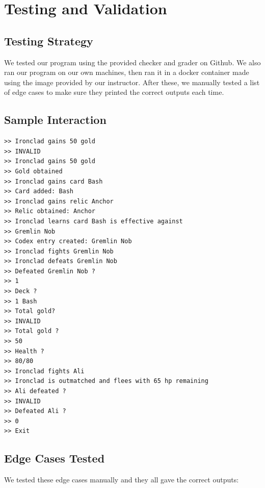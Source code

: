 \documentclass[12pt,a4paper]{article}
\begin{document}
\section{Testing and Validation}

\subsection{Testing Strategy}

We tested our program using the provided checker and grader on Github. We also ran our program on our own machines, then ran it in a docker container made using the image provided by our instructor. After these, we manually tested a list of edge cases to make sure they printed the correct outputs each time.

\subsection{Sample Interaction}

\begin{lstlisting}
>> Ironclad gains 50 gold
>> INVALID
>> Ironclad gains 50 gold
>> Gold obtained
>> Ironclad gains card Bash
>> Card added: Bash
>> Ironclad gains relic Anchor
>> Relic obtained: Anchor
>> Ironclad learns card Bash is effective against 
>> Gremlin Nob
>> Codex entry created: Gremlin Nob
>> Ironclad fights Gremlin Nob
>> Ironclad defeats Gremlin Nob
>> Defeated Gremlin Nob ?
>> 1
>> Deck ?
>> 1 Bash
>> Total gold?
>> INVALID
>> Total gold ?
>> 50
>> Health ?
>> 80/80
>> Ironclad fights Ali
>> Ironclad is outmatched and flees with 65 hp remaining
>> Ali defeated ?
>> INVALID
>> Defeated Ali ?
>> 0
>> Exit
\end{lstlisting}

\subsection{Edge Cases Tested}

We tested these edge cases manually and they all gave the correct outputs:
\end{document}
